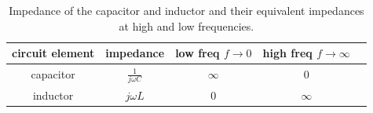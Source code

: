 \documentclass{ximera}
\begin{document}
\begin{table}[htbp]
\centering
\begin{tabular}{|c|c|c|c|c|} \hline
circuit element & impedance & low freq $f \to 0$& high freq $f \to \infty$   \\  \hline
 capacitor     & $\frac{1}{j \omega C}$    & $\infty$ & $0$    \\  \hline       
 inductor & $j \omega L$              &    $0$   &       $\infty $             \\ \hline
\end{tabular}
\caption{Impedance of the capacitor and inductor and their equivalent impedances at high and low frequencies.}
\end{table}
\end{document}
